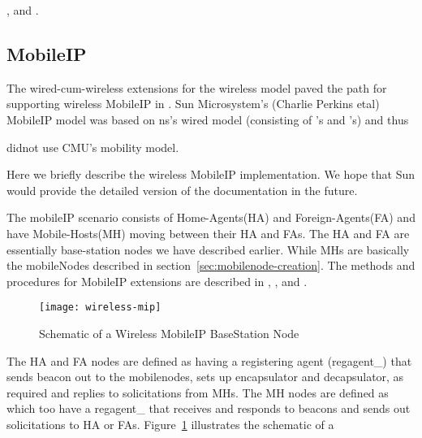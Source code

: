 {,  and .


\subsection{MobileIP}
\label{sec:mobileip}

The wired-cum-wireless extensions for the wireless model paved the path for supporting wireless MobileIP in \ns. Sun Microsystem's (Charlie Perkins etal) MobileIP model was based on ns's wired model (consisting of 's and 's) and thus











 didnot use CMU's mobility model.

Here we briefly describe the wireless MobileIP implementation. We hope that Sun would provide the detailed version of the documentation in the future.

The mobileIP scenario consists of Home-Agents(HA) and Foreign-Agents(FA) and have Mobile-Hosts(MH) moving between their HA and FAs.
The HA and FA are essentially base-station nodes we have described earlier. While MHs are basically the mobileNodes described in section~\ref{sec:mobilenode-creation}.
The methods and procedures for MobileIP extensions are described in , ,  and .

\begin{figure}
    \centerline{\texttt{[image: wireless-mip]}}
    \caption{Schematic of a Wireless MobileIP BaseStation Node}
    \label{fig:mobilenode-wireless-mip}
\end{figure}
The HA and FA nodes are defined as  having a registering agent (regagent\_) that sends beacon out to the mobilenodes, sets up encapsulator and decapsulator, as required and replies to solicitations from MHs. 
The MH nodes are defined as  which too have a regagent\_ that receives and responds to beacons and sends out solicitations to HA or FAs. Figure~\ref{fig:mobilenode-wireless-mip} illustrates the schematic of a 











}
